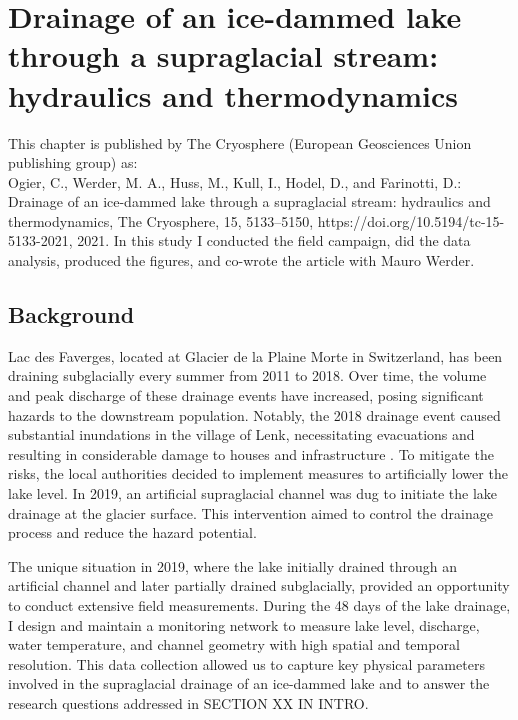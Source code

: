 \chapter{Drainage of an ice-dammed lake through a supraglacial stream: hydraulics and thermodynamics}
\label{ch:chapter_plainemorte}


This chapter is published by The Cryosphere (European Geosciences Union publishing
group) as:\\
Ogier, C., Werder, M. A., Huss, M., Kull, I., Hodel, D., and Farinotti, D.: Drainage of an ice-dammed lake through a supraglacial stream: hydraulics and thermodynamics, The Cryosphere, 15, 5133–5150, https://doi.org/10.5194/tc-15-5133-2021, 2021. In this study I conducted the field campaign, did the data analysis, produced the figures, and co-wrote the article with Mauro Werder.


\section{Background}

Lac des Faverges, located at Glacier de la Plaine Morte in Switzerland, has been draining subglacially every summer from 2011 to 2018. Over time, the volume and peak discharge of these drainage events have increased, posing significant hazards to the downstream population. Notably, the 2018 drainage event caused substantial inundations in the village of Lenk, necessitating evacuations and resulting in considerable damage to houses and infrastructure \citep{GemeindeLenk2019}. To mitigate the risks, the local authorities decided to implement measures to artificially lower the lake level. In 2019, an artificial supraglacial channel was dug to initiate the lake drainage at the glacier surface. This intervention aimed to control the drainage process and reduce the hazard potential. 

The unique situation in 2019, where the lake initially drained through an artificial channel and later partially drained subglacially, provided an opportunity to conduct extensive field measurements. During the 48 days of the lake drainage, I design and maintain a monitoring network to measure lake level, discharge, water temperature, and channel geometry with high spatial and temporal resolution. This data collection allowed us to capture key physical parameters involved in the supraglacial drainage of an ice-dammed lake and to answer the research questions addressed in SECTION XX IN INTRO.

